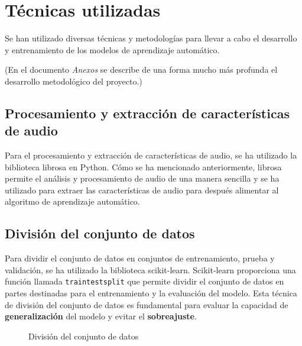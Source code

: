 \section{Técnicas utilizadas}

Se han utilizado diversas técnicas y metodologías para llevar a cabo el desarrollo y entrenamiento de los modelos de aprendizaje automático.

(En el documento \textit{Anexos} se describe de una forma mucho más profunda el desarrollo metodológico del proyecto.)

\subsection{Procesamiento y extracción de características de audio}

Para el procesamiento y extracción de características de audio, se ha utilizado la biblioteca librosa en Python. Cómo se ha mencionado anteriormente, librosa permite el análisis y procesamiento de audio de una manera sencilla y se ha utilizado para extraer las características de audio para después alimentar al algoritmo de aprendizaje automático.

\subsection{División del conjunto de datos}

Para dividir el conjunto de datos en conjuntos de entrenamiento, prueba y validación, se ha utilizado la biblioteca scikit-learn. 
Scikit-learn proporciona una función llamada \texttt{train\textunderscore test\textunderscore split} que permite dividir el conjunto de datos en partes destinadas para el entrenamiento y la evaluación del modelo.
Esta técnica de división del conjunto de datos es fundamental para evaluar la capacidad de \textbf{generalización} del modelo y evitar el \textbf{sobreajuste}.

\begin{figure}
  \centering
  \caption{División del conjunto de datos}
\end{figure}

